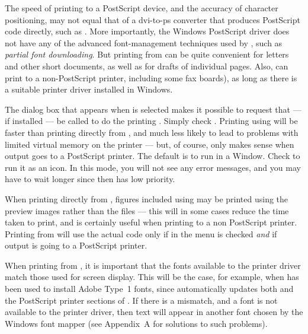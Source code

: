 The speed of printing to a Post\-Script device,
and the accuracy of character positioning,
may not equal that of a {\sc dvi-to-ps} converter that produces
Post\-Script code directly, such as {\DVIPSONE}.
More importantly, the Windows Post\-Script driver does not have
any of the advanced font-management techniques used by {\DVIPSONE},
such as {\it partial font downloading}. %
But printing from {\DVIWindo} can be quite convenient for 
letters and other short documents, as well as for drafts of individual pages.
Also, {\DVIWindo} can print to a non-Post\-Script printer,
including some fax boards), as long as
there is a suitable printer driver installed in Windows.

The dialog box that appears when  is selected makes it
possible to request that {\DVIPSONE} --- if installed ---
be called to do the printing%
. 
Simply check . 
Printing using {\DVIPSONE} will be faster than printing directly from
{\DVIWindo}, and much less likely to lead to problems with limited virtual 
memory on the printer --- but, of course, 
only makes sense when output goes to a Post\-Script printer.
%
The default is to run {\DVIPSONE} in a Window.  
Check  to run it as an icon.
In this mode, you will not see any error messages, and you may have to
wait longer since {\DVIPSONE} then has low priority.

When printing directly from {\DVIWindo},
figures included using {\lavender\verb@\special@\revert}  
may be printed using the preview images rather 
than the {\EPS} files --- this will in some cases reduce the time taken
to print, and is certainly useful when printing to a non Post\-Script printer.
Printing from {\DVIWindo} will use the actual {\EPS} code only if
 in the  menu 
is checked {\it and} if output is going to a Post\-Script printer.

When printing from {\DVIWindo}, it is important that the fonts
available to the printer driver match those used for screen display.
This will be the case, for example, when {\ATM} has been used to
install Adobe Type~1 fonts, since {\ATM} automatically updates both
{\ATMINI} and  the Post\-Script printer sections of {\WININI}.  
If there is a mismatch, and a font is not available to the printer
driver, then text will appear in another font chosen by the Windows
font mapper (see Appendix~A for solutions to such problems).

